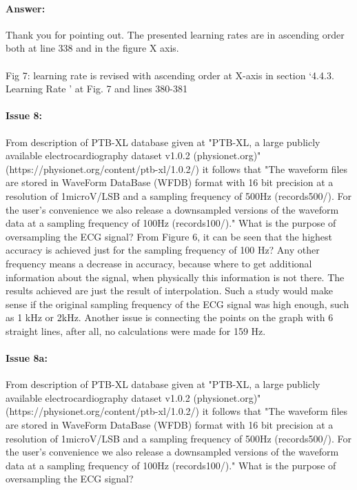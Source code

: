 \documentclass{article}
\begin{document}
\paragraph{Answer:}
Thank you for pointing out. The presented learning rates are in ascending order both at line 338 and in the figure X axis. \\\\

Fig 7: learning rate is revised with ascending order at X-axis in section `4.4.3. Learning Rate ' at Fig. 7 and lines 380-381

\paragraph{Issue 8:}
\begin{displayquote}
From description of PTB-XL database given at "PTB-XL, a large publicly available electrocardiography dataset v1.0.2 (physionet.org)" (https://physionet.org/content/ptb-xl/1.0.2/) it follows that "The waveform files are stored in WaveForm DataBase (WFDB) format with 16 bit precision at a resolution of 1microV/LSB and a sampling frequency of 500Hz (records500/). For the user’s convenience we also release a downsampled versions of the waveform data at a sampling frequency of 100Hz (records100/)." What is the purpose of oversampling the ECG signal? From Figure 6, it can be seen that the highest accuracy is achieved just for the sampling frequency of 100 Hz? Any other frequency means a decrease in accuracy, because where to get additional information about the signal, when physically this information is not there. The results achieved are just the result of interpolation. Such a study would make sense if the original sampling frequency of the ECG signal was high enough, such as 1 kHz or 2kHz. Another issue is connecting the points on the graph with 6 straight lines, after all, no calculations were made for 159 Hz.
\end{displayquote}

\paragraph{Issue 8a:}
\begin{displayquote}
From description of PTB-XL database given at "PTB-XL, a large publicly available electrocardiography dataset v1.0.2 (physionet.org)" (https://physionet.org/content/ptb-xl/1.0.2/) it follows that "The waveform files are stored in WaveForm DataBase (WFDB) format with 16 bit precision at a resolution of 1microV/LSB and a sampling frequency of 500Hz (records500/). For the user’s convenience we also release a downsampled versions of the waveform data at a sampling frequency of 100Hz (records100/)." What is the purpose of oversampling the ECG signal?  
\end{displayquote}
\end{document}
